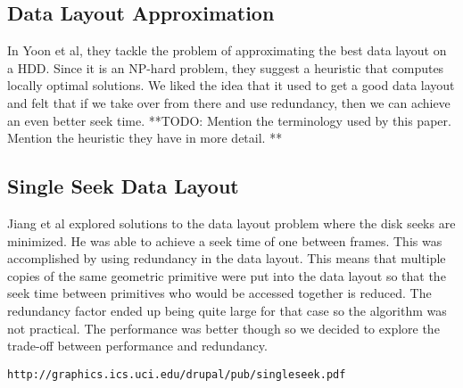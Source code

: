 \documentclass[11pt,psfig]{article}
\begin{document}
\subsection*{Data Layout Approximation}
In Yoon et al, they tackle the problem of approximating the best data layout on a HDD. Since it is an NP-hard problem, they suggest a heuristic that computes locally optimal solutions. We liked the idea that it used to get a good data layout and felt that if we take over from there and use redundancy, then we can achieve an even better seek time.
**TODO: Mention the terminology used by this paper. Mention the heuristic they have in more detail. **\\

\subsection*{Single Seek Data Layout}
Jiang et al explored solutions to the data layout problem where the disk seeks are minimized. He was able to achieve a seek time of one between frames. This was accomplished by using redundancy in the data layout. This means that multiple copies of the same geometric primitive were put into the data layout so that the seek time between primitives who would be accessed together is reduced. The redundancy factor ended up being quite large for that case so the algorithm was not practical. The performance was better though so we decided to explore the trade-off between performance and redundancy. 
\begin{verbatim}
http://graphics.ics.uci.edu/drupal/pub/singleseek.pdf
\end{verbatim}
\end{document}
